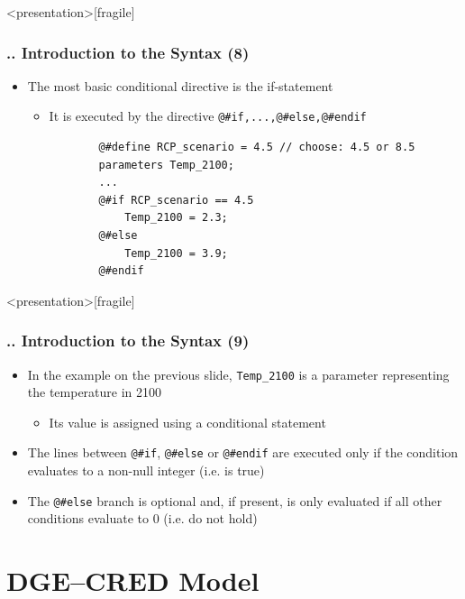 \documentclass[11pt,aspectratio=169]{beamer}
\begin{document}
\begin{frame}<presentation>[fragile]
	\frametitle{{\thesection.\thesubsection.\thesubsubsection} Introduction to the Syntax (8)}
	\begin{itemize}
		\item The most basic conditional directive is the if-statement 
		\begin{itemize}
			\item It is executed by the directive \texttt{@\#if,...,@\#else,@\#endif}
		\end{itemize}
		\begin{verbatim}
		   @#define RCP_scenario = 4.5 // choose: 4.5 or 8.5
		   parameters Temp_2100;
		   ...
		   @#if RCP_scenario == 4.5
		   	   Temp_2100 = 2.3;
		   @#else
		   	   Temp_2100 = 3.9;
		   @#endif
		\end{verbatim}
	\end{itemize}
\end{frame}
\begin{frame}<presentation>[fragile]
	\frametitle{{\thesection.\thesubsection.\thesubsubsection} Introduction to the Syntax (9)}
	\begin{itemize}
		\item In the example on the previous slide, \texttt{Temp\_2100} is a parameter representing the temperature in 2100 
		\begin{itemize}
			\item Its value is assigned using a conditional statement
		\end{itemize}
		\item The lines between \texttt{@\#if}, \texttt{@\#else} or \texttt{@\#endif} are executed only if the condition evaluates to a non-null integer (i.e. is true) 
		\item The \texttt{@\#else} branch is optional and, if present, is only evaluated if all other conditions evaluate to 0 (i.e. do not hold)
	\end{itemize}
\end{frame}

\section{DGE--CRED Model}
\end{document}
